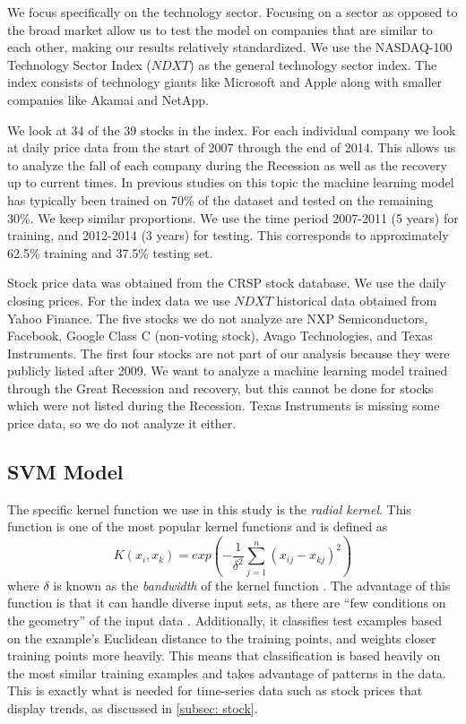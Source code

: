 \documentclass[pageno]{jpaper}
\begin{document}
We focus specifically on the technology sector. Focusing on a sector as opposed to the broad market allow us to test the model on companies that are similar to each other, making our results relatively standardized. We use the NASDAQ-100 Technology Sector Index ($NDXT$) as the general technology sector index. The index consists of technology giants like Microsoft and Apple along with smaller companies like Akamai and NetApp. 

We look at 34 of the 39 stocks in the index. For each individual company we look at daily price data from the start of 2007 through the end of 2014. This allows us to analyze the fall of each company during the Recession as well as the recovery up to current times. In previous studies on this topic the machine learning model has typically been trained on 70\% of the dataset and tested on the remaining 30\%. We keep similar proportions. We use the time period 2007-2011 (5 years) for training, and 2012-2014 (3 years) for testing. This corresponds to approximately 62.5\% training and 37.5\% testing set.

Stock price data was obtained from the CRSP stock database. We use the daily closing prices. For the index data we use $NDXT$ historical data obtained from Yahoo Finance. The five stocks we do not analyze are NXP Semiconductors, Facebook, Google Class C (non-voting stock), Avago Technologies, and Texas Instruments. The first four stocks are not part of our analysis because they were publicly listed after 2009. We want to analyze a machine learning model trained through the Great Recession and recovery, but this cannot be done for stocks which were not listed during the Recession. Texas Instruments is missing some price data, so we do not analyze it either.

\subsection{SVM Model}

The specific kernel function we use in this study is the {\em radial kernel}. This function is one of the most popular kernel functions and is defined as 
$$K(x_i, x_k) = exp\left(-\frac{1}{\delta^2}\sum_{j=1}^n(x_{ij}-x_{kj})^2\right)$$
where $\delta$ is known as the {\em bandwidth} of the kernel function \cite{kim}. The advantage of this function is that it can handle diverse input sets, as there are ``few conditions on the geometry'' of the input data \cite{buhmann}. Additionally, it classifies test examples based on the example's Euclidean distance to the training points, and weights closer training points more heavily. This means that classification is based heavily on the most similar training examples and takes advantage of patterns in the data. This is exactly what is needed for time-series data such as stock prices that display trends, as discussed in \ref{subsec: stock}.
\end{document}
